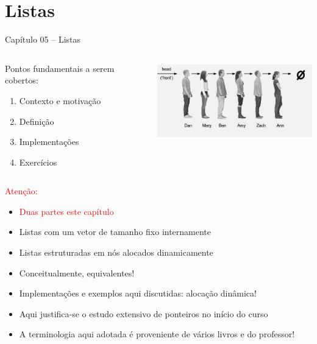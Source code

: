 
\section{Listas}

\begin{frame}

\begin{center}
{\Large Capítulo 05 -- Listas}
\end{center}

\begin{columns}
\begin{column}{.3\textwidth}
\centering
Pontos fundamentais a serem cobertos:
  \begin{enumerate}
  \item Contexto e motivação
  \item Definição
  \item Implementações
  \item Exercícios 
\end{enumerate}  

\end{column}
\begin{column}{.7\textwidth}
\centering
\includegraphics[height=3.3cm, width=7cm]{figs/fig_listas/ilustra_lista.jpg}
\end{column}
\end{columns}


\end{frame}
\begin{frame}

\begin{block}{ \textcolor{red}{Atenção:} }

\begin{itemize}
  \item \textcolor{red}{Duas partes este capítulo}
  \item   Listas com um vetor de tamanho fixo internamente
  \item  Listas estruturadas em nós alocados dinamicamente
  \item  Conceitualmente, equivalentes!
  \item  Implementações e exemplos aqui discutidas: alocação dinâmica!
  \item  Aqui justifica-se o estudo extensivo de 
  ponteiros no início do curso
  \item  A terminologia aqui adotada é proveniente de vários livros e do professor! 
\end{itemize}

\end{block}

\end{frame}
